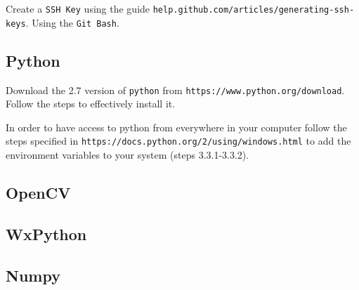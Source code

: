 \documentclass[12pt,letterpaper,onecolumn]{article}
\begin{document}
Create a \texttt{SSH Key} using the guide  \texttt{help.github.com/articles/generating-ssh-keys}.
Using the \texttt{Git Bash}.
\subsection{Python}

Download the 2.7 version of \texttt{python} from \texttt{https://www.python.org/download}.
Follow the steps to effectively install it.

In order to have access to python from everywhere in your computer follow the steps
specified in \texttt{https://docs.python.org/2/using/windows.html} to add the environment
variables to your system (steps 3.3.1-3.3.2).

\subsection{OpenCV}

\subsection{WxPython}

\subsection{Numpy}
\end{document}
